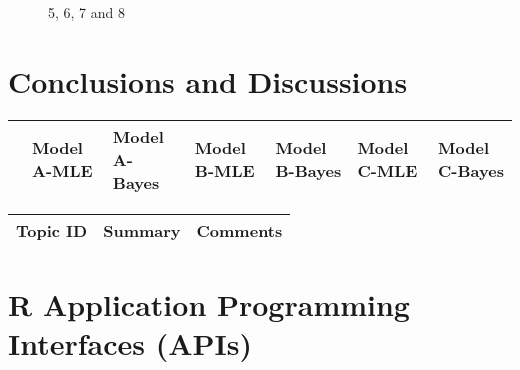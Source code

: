 \begin{figure}[H]
	\centering
	\begin{minipage}[b]{0.5\linewidth}
	\end{minipage}\hfill
	\begin{minipage}[b]{0.5\linewidth}
	\end{minipage}\hfill	
	\begin{minipage}[b]{0.5\linewidth}
	\end{minipage}\hfill
	\begin{minipage}[b]{0.5\linewidth}
	\end{minipage}\hfill
	\caption{5, 6, 7 and 8}
	\label{fig:Figure1}
\end{figure} 


\section{Conclusions and Discussions}

\begin{table}[H]
	\centering
	\begin{tabular}{rp{1cm}p{1cm}p{1cm}p{1cm}p{1cm}p{1cm}}
		\hline
		& Model A-MLE & Model A-Bayes & Model B-MLE & Model B-Bayes & Model C-MLE & Model C-Bayes \\ 
		\hline
		\hline
	\end{tabular}
\end{table}

\begin{table}[H]\centering
	\begin{tabular}{p{1cm}p{4cm}p{3cm}}
		Topic ID & Summary & Comments\\
		\hline
		\hline
	\end{tabular}
\end{table}


\section{R Application Programming Interfaces (APIs)}


